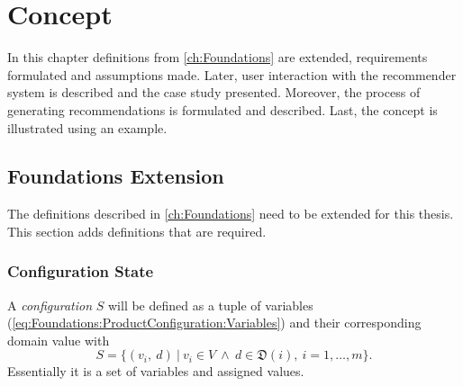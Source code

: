 \chapter{Concept}
\label{ch:Concept}

In this chapter definitions from \autoref{ch:Foundations} are extended, requirements formulated and assumptions made. Later, user interaction with the recommender system is described and the case study presented. Moreover, the process of generating recommendations is formulated and described. Last, the concept is illustrated using an example.

\section{Foundations Extension}
\label{sec:Concept:Requirements}

The definitions described in \autoref{ch:Foundations} need to be extended for this thesis. This section adds definitions that are required.

\subsection{Configuration State}

A \emph{configuration} $S$ will be defined as a tuple of variables (\autoref{eq:Foundations:ProductConfiguration:Variables}) and their corresponding domain value with
\begin{equation} \label{eq:Foundations:ProductConfiguration:ConfigurationState}
    S = \{ (v_i,\ d) \ |\ v_i \in V \ \land \ d \in \mathfrak{D}(i),\ i=1,\dotsc,m \}.
\end{equation}
Essentially it is a set of variables and assigned values.

